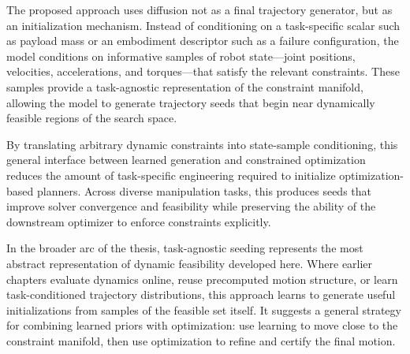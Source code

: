 The proposed approach uses diffusion not as a final trajectory generator, but as an initialization mechanism.
Instead of conditioning on a task-specific scalar such as payload mass or an embodiment descriptor such as a failure configuration, the model conditions on informative samples of robot state---joint positions, velocities, accelerations, and torques---that satisfy the relevant constraints.
These samples provide a task-agnostic representation of the constraint manifold, allowing the model to generate trajectory seeds that begin near dynamically feasible regions of the search space.

By translating arbitrary dynamic constraints into state-sample conditioning, this general interface between learned generation and constrained optimization reduces the amount of task-specific engineering required to initialize optimization-based planners.
Across diverse manipulation tasks, this produces seeds that improve solver convergence and feasibility while preserving the ability of the downstream optimizer to enforce constraints explicitly.

In the broader arc of the thesis, task-agnostic seeding represents the most abstract representation of dynamic feasibility developed here.
Where earlier chapters evaluate dynamics online, reuse precomputed motion structure, or learn task-conditioned trajectory distributions, this approach learns to generate useful initializations from samples of the feasible set itself.
It suggests a general strategy for combining learned priors with optimization: use learning to move close to the constraint manifold, then use optimization to refine and certify the final motion.



